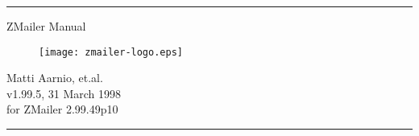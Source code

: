 \documentclass[twoside,a4paper]{article}
\begin{document}
\startdocument

\begin{titlepage}

\hrule
\begin{center}

{\Large \vspace{4ex}}
{\Large ZMailer Manual} \\
{\Large \vspace{4ex}}

\begin{figure}[h]
  \texttt{[image: zmailer-logo.eps]}
\end{figure}

{\Large \vspace{4ex}}
{\large Matti Aarnio, et.al.} \\
{\large \vspace{4ex}}
{v1.99.5, 31 March 1998} \\
{for ZMailer 2.99.49p10}
\end{center}
\vfill
\hrule

\end{titlepage}

\cleardoublepage


%
\end{document}
